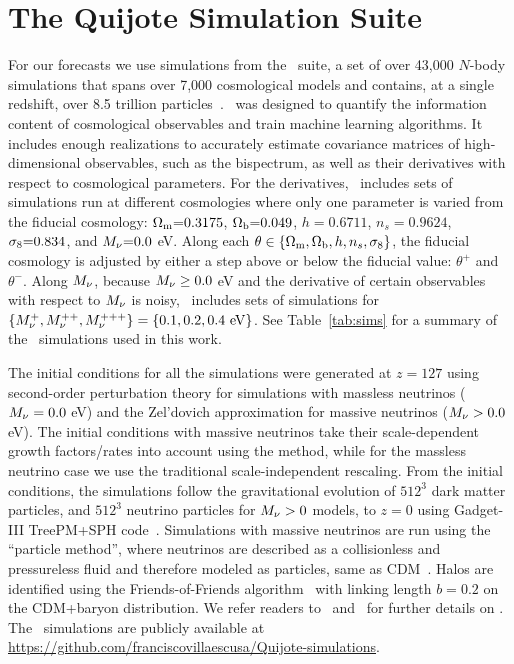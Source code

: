 \section{The Quijote Simulation Suite} \label{sec:sims}
For our forecasts we use simulations from the \quij~suite, a set of over 43,000 
$N$-body simulations that spans over 7,000 cosmological models and contains, at a single 
redshift, over 8.5 trillion particles~\citep{villaescusa-navarro2020a}. 
\quij~was designed to quantify the information content of cosmological 
observables and train machine learning algorithms. It includes enough
realizations to accurately estimate covariance matrices 
of high-dimensional observables, such as the bispectrum, as well as their derivatives 
with respect to cosmological parameters. For the derivatives, 
\quij~includes sets of simulations run at different cosmologies where only 
one parameter is varied from the fiducial cosmology:
$\Omega_{\rm m}{=}0.3175$, $\Omega_{\rm b}{=}0.049$, $h{=}0.6711$, $n_s{=}0.9624$, $\sigma_8{=}0.834$, 
and $M_\nu{=}0.0$ eV. Along each $\theta \in \{\Omega_{\rm m}, \Omega_{\rm b}, h, n_s, \sigma_8\}$, the fiducial 
cosmology is adjusted by either a step above or below the fiducial value:
$\theta^{+}$ and $\theta^{-}$. 
Along $M_\nu$, because $M_\nu \ge 0.0$ eV and the derivative of certain
observables with respect to $M_\nu$ is noisy, \quij~includes sets of simulations for 
$\{M_\nu^{+}, M_\nu^{++}, M_\nu^{+++} \} = \{0.1, 0.2, 0.4~{\rm eV}\}$. See 
Table~\ref{tab:sims} for a summary of the \quij~simulations used in this work. 

The initial conditions for all the simulations were generated at $z{=}127$ using 
second-order perturbation theory for simulations with massless neutrinos 
($M_\nu = 0.0$ eV) and the Zel’dovich approximation for massive neutrinos 
($M_\nu > 0.0$ eV). The initial conditions with massive neutrinos take 
their scale-dependent growth factors/rates into account using the 
\cite{zennaro2017a} method, while for the massless neutrino case we use 
the traditional scale-independent rescaling. From the initial conditions, 
the simulations follow the gravitational evolution of $512^3$ dark matter
particles, and $512^3$ neutrino particles for $M_\nu > 0$ models, to 
$z=0$ using {\sc Gadget-III} TreePM+SPH code~\citep{springel2005}. Simulations 
with massive neutrinos are run using the ``particle method'', where neutrinos 
are described as a collisionless and pressureless fluid and therefore modeled 
as particles, same as CDM~\citep{brandbyge2008,viel2010}. Halos are identified 
using the Friends-of-Friends algorithm~\citep[FoF;][]{davis1985} with linking
length $b=0.2$ on the CDM+baryon distribution. 
We refer readers to~\cite{villaescusa-navarro2020a}
and~\cite{hahn2020} for further details on \quij. The
\quij~simulations are publicly available at
\url{https://github.com/franciscovillaescusa/Quijote-simulations}.
